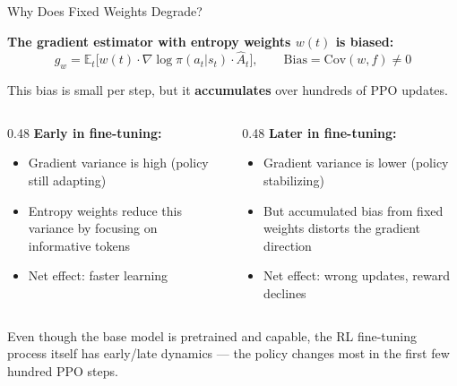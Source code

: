 \documentclass[aspectratio=169,10pt]{beamer}
\begin{document}
\begin{frame}{Why Does Fixed Weights Degrade?}

\textbf{The gradient estimator with entropy weights $w(t)$ is biased:}
\[
g_w = \mathbb{E}_t\bigl[w(t) \cdot \nabla\log\pi(a_t|s_t) \cdot \hat{A}_t\bigr], \qquad \text{Bias} = \text{Cov}(w, f) \neq 0
\]

This bias is small per step, but it \textbf{accumulates} over hundreds of PPO updates.

\vspace{0.3cm}
\begin{columns}
\begin{column}{0.48\textwidth}
\textbf{Early in fine-tuning:}
\begin{itemize}
    \item Gradient variance is high (policy still adapting)
    \item Entropy weights reduce this variance by focusing on informative tokens
    \item Net effect: \textcolor{good}{faster learning}
\end{itemize}
\end{column}
\begin{column}{0.48\textwidth}
\textbf{Later in fine-tuning:}
\begin{itemize}
    \item Gradient variance is lower (policy stabilizing)
    \item But accumulated bias from fixed weights distorts the gradient direction
    \item Net effect: \textcolor{bad}{wrong updates, reward declines}
\end{itemize}
\end{column}
\end{columns}

\vspace{0.3cm}
Even though the base model is pretrained and capable, the RL fine-tuning process itself has early/late dynamics --- the policy changes most in the first few hundred PPO steps.

\end{frame}
\end{document}

